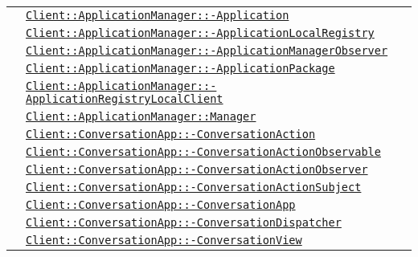 \begin{longtable}{|>{\centering}m{3cm}|m{10cm}<{\centering}|}
& \hyperref[Client::ApplicationManager::Application]{\texttt{Client::ApplicationManager::-\linebreak Application}}\\
& \hyperref[Client::ApplicationManager::ApplicationLocalRegistry]{\texttt{Client::ApplicationManager::-\linebreak ApplicationLocalRegistry}}\\
& \hyperref[Client::ApplicationManager::ApplicationManagerObserver]{\texttt{Client::ApplicationManager::-\linebreak ApplicationManagerObserver}}\\
& \hyperref[Client::ApplicationManager::ApplicationPackage]{\texttt{Client::ApplicationManager::-\linebreak ApplicationPackage}}\\
& \hyperref[Client::ApplicationManager::ApplicationRegistryLocalClient]{\texttt{Client::ApplicationManager::-\linebreak ApplicationRegistryLocalClient}}\\
& \hyperref[Client::ApplicationManager::Manager]{\texttt{Client::ApplicationManager::Manager}}\\
& \hyperref[Client::ConversationApp::ConversationAction]{\texttt{Client::ConversationApp::-\linebreak ConversationAction}}\\
& \hyperref[Client::ConversationApp::ConversationActionObservable]{\texttt{Client::ConversationApp::-\linebreak ConversationActionObservable}}\\
& \hyperref[Client::ConversationApp::ConversationActionObserver]{\texttt{Client::ConversationApp::-\linebreak ConversationActionObserver}}\\
& \hyperref[Client::ConversationApp::ConversationActionSubject]{\texttt{Client::ConversationApp::-\linebreak ConversationActionSubject}}\\
& \hyperref[Client::ConversationApp::ConversationApp]{\texttt{Client::ConversationApp::-\linebreak ConversationApp}}\\
& \hyperref[Client::ConversationApp::ConversationDispatcher]{\texttt{Client::ConversationApp::-\linebreak ConversationDispatcher}}\\
& \hyperref[Client::ConversationApp::ConversationView]{\texttt{Client::ConversationApp::-\linebreak ConversationView}}\\

\end{longtable}
